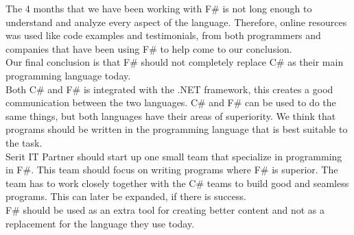 \documentclass[12pt, a4paper]{article}
\begin{document}
The 4 months that we have been working with F\# is not long enough to understand and analyze every aspect of the language. Therefore, online resources was used like code examples and testimonials, from both programmers and companies that have been using F\# to help come to our conclusion.\\

Our final conclusion is that F\# should not completely replace C\# as their main programming language today.\\  

Both C\# and F\# is integrated with the .NET framework, this creates a good communication between the two languages. C\# and F\# can be used to do the same things, but both languages have their areas of superiority. We think that programs should be written in the programming language that is best suitable to the task.\\

Serit IT Partner should start up one small team that specialize in programming in F\#. This team should focus on writing programs where F\# is superior. The team has to work closely together with the C\# teams to build good and seamless programs. This can later be expanded, if there is success.\\

F\# should be used as an extra tool for creating better content and not as a replacement for the language they use today. 

\newpage

\end{document}
